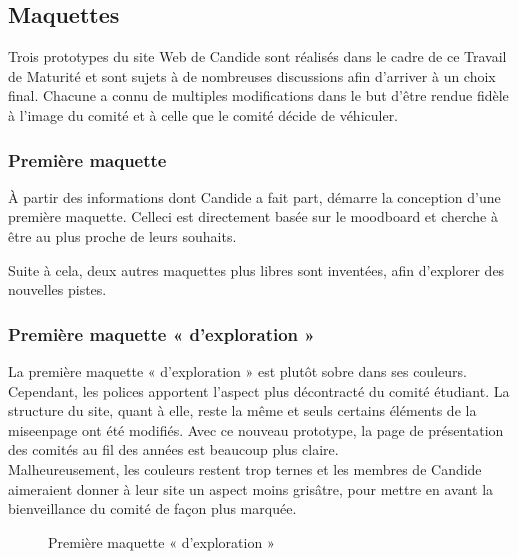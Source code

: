 \documentclass[a4,10pt,french]{sphinxmanual}
\begin{document}
\subsection{Maquettes}
\label{\detokenize{chapitre-06:maquettes}}
\sphinxAtStartPar
Trois prototypes du site Web de Candide sont réalisés dans le cadre de ce Travail de Maturité et sont sujets à de nombreuses discussions afin d’arriver à un choix final. Chacune a connu de multiples modifications dans le but d’être rendue fidèle à l’image du comité et à celle que le comité décide de véhiculer.


\subsubsection{Première maquette}
\label{\detokenize{chapitre-06:premiere-maquette}}
\sphinxAtStartPar
À partir des informations dont Candide a fait part, démarre la conception d’une première maquette. Celle\sphinxhyphen{}ci est directement basée sur le moodboard et cherche à être au plus proche de leurs souhaits.

\sphinxAtStartPar
Suite à cela, deux autres maquettes plus libres sont inventées, afin d’explorer des nouvelles pistes.


\subsubsection{Première maquette « d’exploration »}
\label{\detokenize{chapitre-06:premiere-maquette-dexploration}}
\sphinxAtStartPar
La première maquette « d’exploration » est plutôt sobre dans ses couleurs. Cependant, les polices apportent l’aspect plus décontracté du comité étudiant. La structure du site, quant à elle, reste la même et seuls certains éléments de la mise\sphinxhyphen{}en\sphinxhyphen{}page ont été modifiés. Avec ce nouveau prototype, la page de présentation des comités au fil des années est beaucoup plus claire.\\
Malheureusement, les couleurs restent trop ternes et les membres de Candide aimeraient donner à leur site un aspect moins grisâtre, pour mettre en avant la bienveillance du comité de façon plus marquée.

\begin{figure}[htbp]
\centering
\capstart

\noindent{}
\caption{Première maquette « d’exploration »}\label{\detokenize{chapitre-06:id2}}\end{figure}
\end{document}
